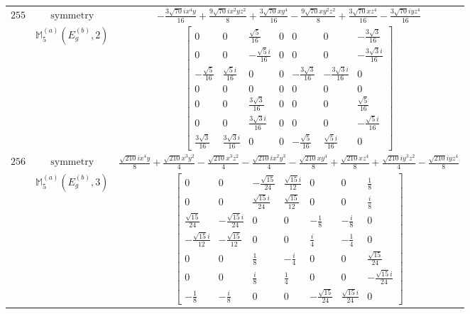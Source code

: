 \documentclass[fleqn,8pt,landscape]{jsarticle}
\begin{document}
\begin{longtable}{ccc}
$ 255 $ & $ \text{symmetry} $ & $ - \frac{3 \sqrt{70} i x^{4} y}{16} + \frac{9 \sqrt{70} i x^{2} y z^{2}}{8} + \frac{3 \sqrt{70} x y^{4}}{16} - \frac{9 \sqrt{70} x y^{2} z^{2}}{8} + \frac{3 \sqrt{70} x z^{4}}{16} - \frac{3 \sqrt{70} i y z^{4}}{16} $ \\
$  $ & $ \mathbb{M}_{5}^{(a)}(E_{g}^{(b)},2) $ & $ \begin{bmatrix} 0 & 0 & \frac{\sqrt{5}}{16} & 0 & 0 & 0 & - \frac{3 \sqrt{3}}{16} \\ 0 & 0 & - \frac{\sqrt{5} i}{16} & 0 & 0 & 0 & - \frac{3 \sqrt{3} i}{16} \\ - \frac{\sqrt{5}}{16} & \frac{\sqrt{5} i}{16} & 0 & 0 & - \frac{3 \sqrt{3}}{16} & - \frac{3 \sqrt{3} i}{16} & 0 \\ 0 & 0 & 0 & 0 & 0 & 0 & 0 \\ 0 & 0 & \frac{3 \sqrt{3}}{16} & 0 & 0 & 0 & \frac{\sqrt{5}}{16} \\ 0 & 0 & \frac{3 \sqrt{3} i}{16} & 0 & 0 & 0 & - \frac{\sqrt{5} i}{16} \\ \frac{3 \sqrt{3}}{16} & \frac{3 \sqrt{3} i}{16} & 0 & 0 & - \frac{\sqrt{5}}{16} & \frac{\sqrt{5} i}{16} & 0 \end{bmatrix} $ \\ \hline
$ 256 $ & $ \text{symmetry} $ & $ \frac{\sqrt{210} i x^{4} y}{8} + \frac{\sqrt{210} x^{3} y^{2}}{4} - \frac{\sqrt{210} x^{3} z^{2}}{4} - \frac{\sqrt{210} i x^{2} y^{3}}{4} - \frac{\sqrt{210} x y^{4}}{8} + \frac{\sqrt{210} x z^{4}}{8} + \frac{\sqrt{210} i y^{3} z^{2}}{4} - \frac{\sqrt{210} i y z^{4}}{8} $ \\
$  $ & $ \mathbb{M}_{5}^{(a)}(E_{g}^{(b)},3) $ & $ \begin{bmatrix} 0 & 0 & - \frac{\sqrt{15}}{24} & \frac{\sqrt{15} i}{12} & 0 & 0 & \frac{1}{8} \\ 0 & 0 & \frac{\sqrt{15} i}{24} & \frac{\sqrt{15}}{12} & 0 & 0 & \frac{i}{8} \\ \frac{\sqrt{15}}{24} & - \frac{\sqrt{15} i}{24} & 0 & 0 & - \frac{1}{8} & - \frac{i}{8} & 0 \\ - \frac{\sqrt{15} i}{12} & - \frac{\sqrt{15}}{12} & 0 & 0 & \frac{i}{4} & - \frac{1}{4} & 0 \\ 0 & 0 & \frac{1}{8} & - \frac{i}{4} & 0 & 0 & \frac{\sqrt{15}}{24} \\ 0 & 0 & \frac{i}{8} & \frac{1}{4} & 0 & 0 & - \frac{\sqrt{15} i}{24} \\ - \frac{1}{8} & - \frac{i}{8} & 0 & 0 & - \frac{\sqrt{15}}{24} & \frac{\sqrt{15} i}{24} & 0 \end{bmatrix} $ \\ \hline
\end{longtable}
\end{document}
